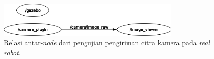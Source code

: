 
\begin{figure}[ht]
  \centering
  \includegraphics[width=0.8\textwidth,keepaspectratio]{gambar/rosgraph-camera-plugin.png}
  \caption{Relasi antar-\emph{node} dari pengujian pengiriman citra kamera pada \emph{real robot}.}
  \label{fig:rosgraphcamera}
\end{figure}






